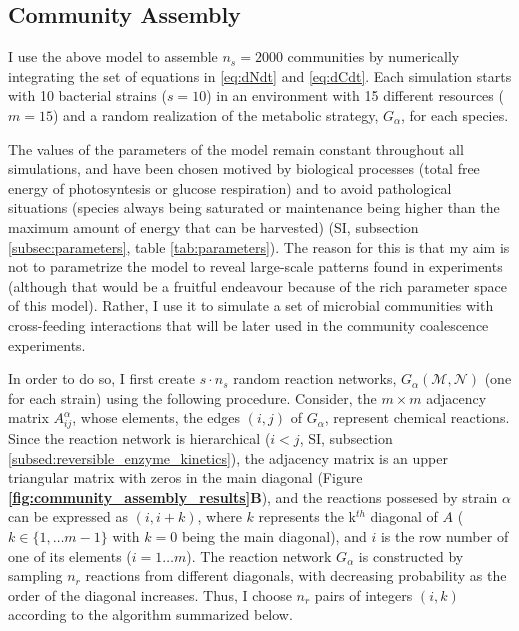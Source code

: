 \documentclass[titlepage,11pt]{article}
\begin{document}
\begin{linenumbers}
				\subsection{Community Assembly}
				 \hspace{15pt}I use the above model to assemble $ n_{s} = 2000 $ communities by numerically integrating the set of equations in \ref{eq:dNdt} and \ref{eq:dCdt}. Each simulation starts with 10 bacterial strains ($ s = 10 $) in an environment with 15 different resources ($ m = 15 $) and a random realization of the metabolic strategy, $ G_{\alpha} $, for each species.\par	
				The values of the parameters of the model remain constant throughout all simulations, and have been chosen motived by biological processes (total free energy of photosyntesis or glucose respiration) and to avoid pathological situations (species always being saturated or maintenance being higher than the maximum amount of energy that can be harvested) (SI, subsection \ref{subsec:parameters}, table \ref{tab:parameters}). The reason for this is that my aim is not to parametrize the model to reveal large-scale patterns found in experiments (although that would be a fruitful endeavour because of the rich parameter space of this model). Rather, I use it to simulate a set of microbial communities with cross-feeding interactions that will be later used in the community coalescence experiments.\par
				In order to do so, I first create $ s \cdot n_{s}  $ random reaction networks, $ G_{\alpha}(\mathcal{M}, \mathcal{N}) $ (one for each strain) using the following  procedure. Consider, the $ m \times m $ adjacency matrix $ A^{\alpha}_{ij} $, whose elements, the edges $ (i, j) $ of $ G_{\alpha}$, represent chemical reactions. Since the reaction network is hierarchical ($ i < j $, SI, subsection \ref{subsed:reversible_enzyme_kinetics}), the adjacency matrix is an upper triangular matrix with zeros in the main diagonal (Figure \textbf{\ref{fig:community_assembly_results}B}), and the reactions possesed by strain $ \alpha $ can be expressed as $ (i, i + k) $, where $ k $ represents the k$ ^{th} $ diagonal of $ A $ ($ k \in \{1, \dots m - 1 \}$ with $ k = 0 $ being the main diagonal), and $ i $ is the row number of one of its elements ($ i = 1 \dots m $). The reaction network $ G_{\alpha} $ is constructed by sampling $ n_{r} $ reactions from  different diagonals, with decreasing probability as the order of the diagonal increases. Thus, I choose $ n_{r} $ pairs of integers $ (i , k )$ according to the algorithm summarized below.	

\end{linenumbers}
\end{document}
